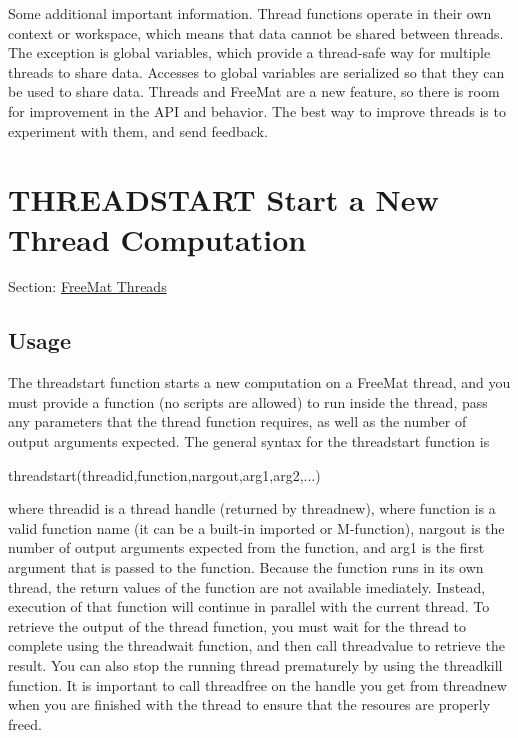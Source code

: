 Some additional important information. Thread functions operate in their own context or workspace, which means that data cannot be shared between threads. The exception is {\ttfamily global} variables, which provide a thread-\/safe way for multiple threads to share data. Accesses to global variables are serialized so that they can be used to share data. Threads and Free\-Mat are a new feature, so there is room for improvement in the A\-P\-I and behavior. The best way to improve threads is to experiment with them, and send feedback. \hypertarget{thread_threadstart}{}\section{T\-H\-R\-E\-A\-D\-S\-T\-A\-R\-T Start a New Thread Computation}\label{thread_threadstart}
Section\-: \hyperlink{sec_thread}{Free\-Mat Threads} \hypertarget{vtkwidgets_vtkxyplotwidget_Usage}{}\subsection{Usage}\label{vtkwidgets_vtkxyplotwidget_Usage}
The {\ttfamily threadstart} function starts a new computation on a Free\-Mat thread, and you must provide a function (no scripts are allowed) to run inside the thread, pass any parameters that the thread function requires, as well as the number of output arguments expected. The general syntax for the {\ttfamily threadstart} function is \begin{DoxyVerb}   threadstart(threadid,function,nargout,arg1,arg2,...)
\end{DoxyVerb}
 where {\ttfamily threadid} is a thread handle (returned by {\ttfamily threadnew}), where {\ttfamily function} is a valid function name (it can be a built-\/in imported or M-\/function), {\ttfamily nargout} is the number of output arguments expected from the function, and {\ttfamily arg1} is the first argument that is passed to the function. Because the function runs in its own thread, the return values of the function are not available imediately. Instead, execution of that function will continue in parallel with the current thread. To retrieve the output of the thread function, you must wait for the thread to complete using the {\ttfamily threadwait} function, and then call {\ttfamily threadvalue} to retrieve the result. You can also stop the running thread prematurely by using the {\ttfamily threadkill} function. It is important to call {\ttfamily threadfree} on the handle you get from {\ttfamily threadnew} when you are finished with the thread to ensure that the resoures are properly freed.

